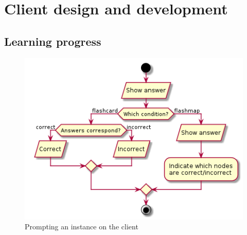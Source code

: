 \chapter{Client design and development}
\label{ch:client}

\section{Learning progress}
\label{sec:learningprogress}

\begin{figure}[h!]
\centering
\includegraphics[width=\textwidth]{img/learningclient.png}
\caption{Prompting an instance on the client}
\label{fig:learningclient}
\end{figure}
